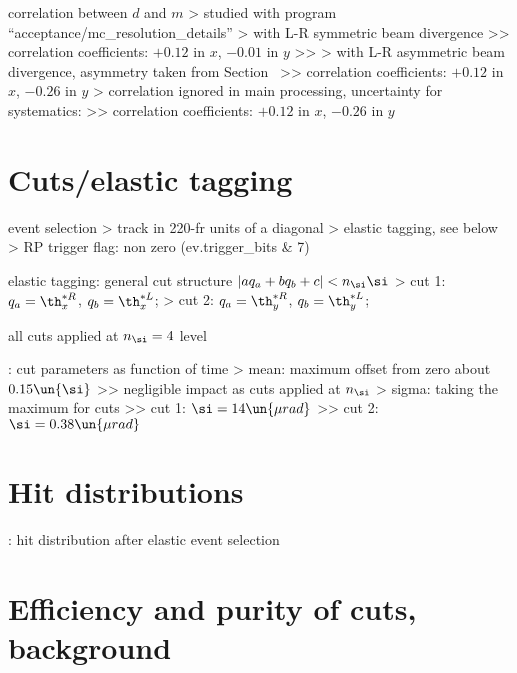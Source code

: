 \> correlation between $d$ and $m$
\>> studied with program ``acceptance/mc\_resolution\_details''
\>> with L-R symmetric beam divergence
\>>> correlation coefficients: $+0.12$ in $x$, $-0.01$ in $y$
\>>> 
\>> with L-R asymmetric beam divergence, asymmetry taken from Section~
\>>> correlation coefficients: $+0.12$ in $x$, $-0.26$ in $y$
\>> correlation ignored in main processing, uncertainty for systematics:
\>>> correlation coefficients: $+0.12$ in $x$, $-0.26$ in $y$


\chapter{Cuts/elastic tagging}

\> event selection
\>> track in 220-fr units of a diagonal
\>> elastic tagging, see below
\>> RP trigger flag: non zero (ev.trigger\_bits \& 7)

\> elastic tagging: general cut structure $| a q_a + b q_b + c| < n_\si  \si$
\>> cut 1: $q_a = \th_x^{*R}$, $q_b = \th_x^{*L}$; 
\>> cut 2: $q_a = \th_y^{*R}$, $q_b = \th_y^{*L}$; 

\> all cuts applied at $n_\si = 4$ level

\>  : cut parameters as function of time
\>> mean: maximum offset from zero about $0.15\un{\si}$
\>>> negligible impact as cuts applied at $n_\si$
\>> sigma: taking the maximum for cuts
\>>> cut 1: $\si = 14\un{\mu rad}$
\>>> cut 2: $\si = 0.38\un{\mu rad}$



\chapter{Hit distributions}

\> : hit distribution after elastic event selection



\chapter{Efficiency and purity of cuts, background}

